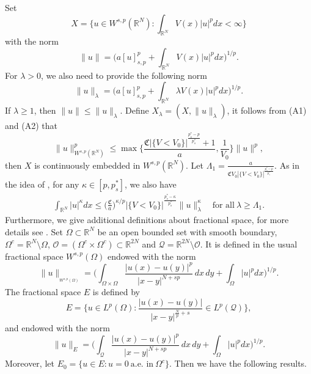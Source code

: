 \documentclass[10pt,a4paper]{amsart}
\numberwithin{equation}{section}
\begin{document}
Set
$$
X=\Big\{u\in W^{s,p}(\mathbb{R}^N):\int_{\mathbb{R}^N}V(x)|u|^pdx<\infty \Big\}
$$
with the norm
$$
\|u\|=\Big(a[u]_{s,p}^p+\int_{\mathbb{R}^N}V(x)|u|^pdx\Big)^{1/p}.
$$
For $\lambda>0$, we also need to provide the following norm
$$
\|u\|_\lambda=\Big(a[u]_{s,p}^p+\int_{\mathbb{R}^N}\lambda V(x)|u|^pdx\Big)^{1/p}.
$$
If $\lambda\geq1$, then $\|u\|\leq\|u\|_\lambda$. Define $X_\lambda=(X, \|u\|_\lambda)$, 
it follows from (A1) and (A2) that
$$
\|u\|^p_{W^{s,p}(\mathbb{R}^N)}
\leq \max \Big\{\frac{\mathfrak{C}|\{V<V_0\}|^{\frac{p^*_s-p}{p^*_s}}+1}{a}, 
\frac{1}{V_0} \Big\}\|u\|^p,
$$
then $X$ is continuously embedded in $W^{s,p}(\mathbb{R}^N)$. 
Let $\Lambda_1=\frac{a}{\mathfrak{C}V_0|\{V<V_0\}|^{\frac{p^*_s-p}{p^*_s}}}$.
As in the idea of  \cite{r23}, for any $\kappa\in[p, p^*_s]$, we also have
\begin{equation}\label{lab2.1}
\begin{gathered}
\int_{\mathbb{R}^N}|u|^\kappa dx
\leq \Big(\frac{\mathfrak{C}}{a}\Big)^{\kappa/p}|\{V<V_0\}
|^{\frac{p^*_s-\kappa}{p^*_s}}
\|u\|^\kappa_\lambda\quad \text{for all}\ \lambda\geq\Lambda_1.
\end{gathered}
\end{equation}
Furthermore, we give additional definitions about fractional space, for more 
details see \cite{r5, r9, r22, r31}. 
Set $\Omega\subset\mathbb{R}^N$ be an open bounded set with smooth boundary, 
$\Omega^c=\mathbb{R}^N\setminus \Omega$, 
$\mathcal{O}=(\Omega^c\times\Omega^c)\subset\mathbb{R}^{2N}$ and 
$\mathcal{Q}=\mathbb{R}^{2N}\setminus \mathcal{O}$. 
It is defined in the usual fractional space $W^{s,p}(\Omega)$ endowed with the norm
$$
\|u\|_{_{W^{s,p}(\Omega)}}
=\Big(\int_{\Omega\times\Omega}\frac{|u(x)-u(y)|^p}{|x-y|^{N+sp}}\,dx\,dy
+\int_{\Omega}|u|^pdx\Big)^{1/p}.
$$
The fractional space $E$ is defined by
$$
E=\Big\{u\in L^p(\Omega): \frac{|u(x)-u(y)|}{|x-y|^{\frac{N}{p}+s}}
\in L^p(\mathcal{Q})\Big\},
$$
and endowed with the norm
$$
\|u\|_E=\Big(\int_\mathcal{Q}\frac{|u(x)-u(y)|^p}{|x-y|^{N+sp}}\,dx\,dy
+\int_\Omega |u|^pdx\Big)^{1/p}.
$$
Moreover, let
$E_0=\{u\in E: u=0\ \text{a.e. in}\ \Omega^c\}$.
Then we have the following results.
\end{document}
